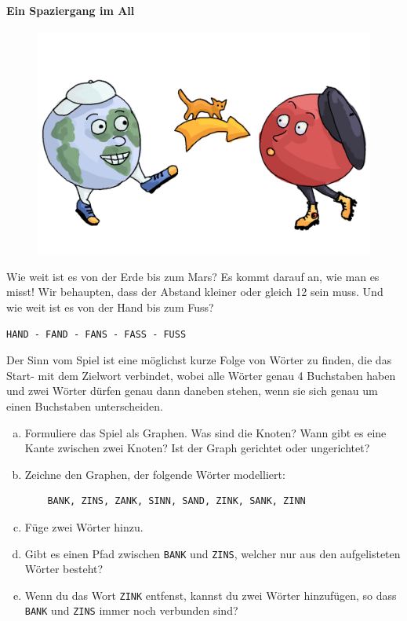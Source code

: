 \paragraph{Ein Spaziergang im All}
\begin{figure}[H]
    \centering
    \includegraphics[width=\textwidth]{Pictures/SP/erde_mars.png}
\end{figure}
Wie weit ist es von der Erde bis zum Mars? Es kommt darauf an, wie man es misst! Wir behaupten, dass der Abstand kleiner oder gleich 12 sein muss. Und wie weit ist es von der Hand bis zum Fuss?
\begin{lstlisting}
HAND - FAND - FANS - FASS - FUSS
\end{lstlisting}
Der Sinn vom Spiel ist eine möglichst kurze Folge von Wörter zu finden, die das Start- mit dem Zielwort verbindet, wobei alle Wörter genau 4 Buchstaben haben und zwei Wörter dürfen genau dann daneben stehen, wenn sie sich genau um einen Buchstaben unterscheiden.


\begin{aufgabe}
\begin{enumerate}[(a)]\label{aufgabe_erde_mars_graph}
    \item Formuliere das Spiel als Graphen. Was sind die Knoten? Wann gibt es eine Kante zwischen zwei Knoten? Ist der Graph gerichtet oder ungerichtet?
    \item Zeichne den Graphen, der folgende Wörter modelliert:
    \begin{lstlisting}
    BANK, ZINS, ZANK, SINN, SAND, ZINK, SANK, ZINN
    \end{lstlisting}
    \item Füge zwei Wörter hinzu.
    \item Gibt es einen Pfad zwischen \texttt{BANK} und \texttt{ZINS}, welcher nur aus den aufgelisteten Wörter besteht?
    \item Wenn du das Wort \texttt{ZINK} entfenst, kannst du zwei Wörter hinzufügen, so dass \texttt{BANK} und \texttt{ZINS} immer noch verbunden sind?
\end{enumerate}

\end{aufgabe}

